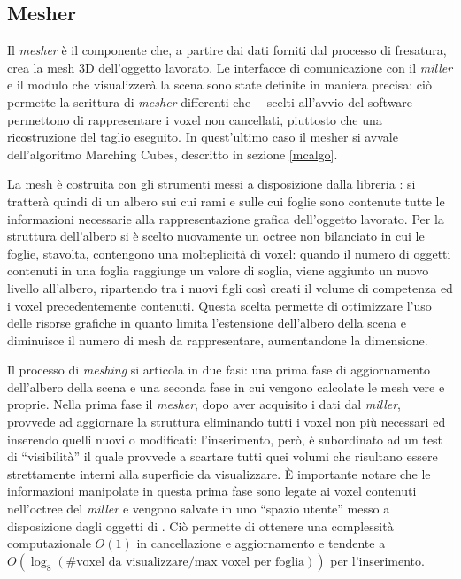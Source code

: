 \subsection{Mesher}
\label{sec:modules_mesher}
Il \emph{mesher} è il componente che, a partire dai dati forniti dal processo di fresatura, crea la mesh 3D dell'oggetto lavorato. Le interfacce di comunicazione con il \emph{miller} e il modulo che visualizzerà la scena sono state definite in maniera precisa: ciò permette la scrittura di \emph{mesher} differenti che ---scelti all'avvio del software--- permettono di rappresentare i voxel non cancellati, piuttosto che una ricostruzione del taglio eseguito. In quest'ultimo caso il mesher si avvale dell'algoritmo Marching Cubes, descritto in sezione \ref{mcalgo}.

La mesh è costruita con gli strumenti messi a disposizione dalla libreria \osg: si tratterà quindi di un albero sui cui rami e sulle cui foglie sono contenute tutte le informazioni necessarie alla rappresentazione grafica dell'oggetto lavorato. Per la struttura dell'albero si è scelto nuovamente un octree non bilanciato in cui le foglie, stavolta, contengono una molteplicità di voxel: quando il numero di oggetti contenuti in una foglia raggiunge un valore di soglia, viene aggiunto un nuovo livello all'albero, ripartendo tra i nuovi figli così creati il volume di competenza ed i voxel precedentemente contenuti. Questa scelta permette di ottimizzare l'uso delle risorse grafiche in quanto limita l'estensione dell'albero della scena e diminuisce il numero di mesh da rappresentare, aumentandone la dimensione.

Il processo di \emph{meshing} si articola in due fasi: una prima fase di aggiornamento dell'albero della scena e una seconda fase in cui vengono calcolate le mesh vere e proprie. Nella prima fase il \emph{mesher}, dopo aver acquisito i dati dal \emph{miller}, provvede ad aggiornare la struttura eliminando tutti i voxel non più necessari ed inserendo quelli nuovi o modificati: l'inserimento, però, è subordinato ad un test di ``visibilità'' il quale provvede a scartare tutti quei volumi che risultano essere strettamente interni alla superficie da visualizzare. È importante notare che le informazioni manipolate in questa prima fase sono legate ai voxel contenuti nell'octree del \emph{miller} e vengono salvate in uno ``spazio utente'' messo a disposizione dagli oggetti di \osg. Ciò permette di ottenere una complessità computazionale $O(1)$ in cancellazione e aggiornamento e tendente a $O(\log_{8}(\text{\# voxel da visualizzare}/\text{max voxel per foglia}))$ per l'inserimento. 

